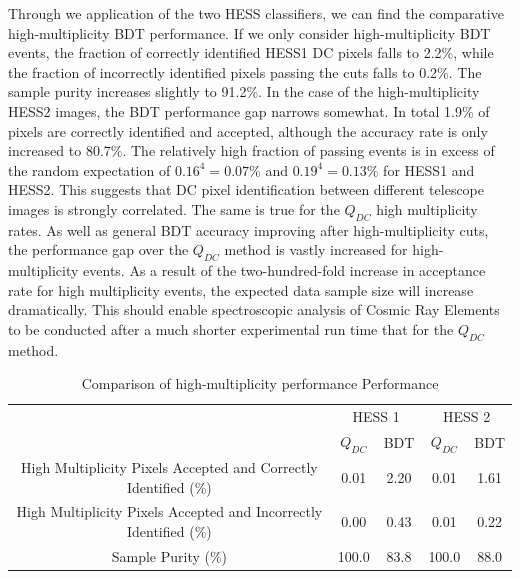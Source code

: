 \documentclass[11pt]{article}
\begin{document}
Through we application of the two HESS classifiers, we can find the comparative high-multiplicity BDT performance. If we only consider high-multiplicity BDT events, the fraction of correctly identified HESS1 DC pixels falls to 2.2\%, while the fraction of incorrectly identified pixels passing the cuts falls to 0.2\%. The sample purity increases slightly to 91.2\%. In the case of the high-multiplicity HESS2 images, the BDT performance gap narrows somewhat. In total 1.9\% of pixels are correctly identified and accepted, although the accuracy rate is only increased to 80.7\%. The relatively high fraction of passing events is in excess of the random expectation of $0.16^{4}=0.07\%$ and $0.19^{4}=0.13\%$ for HESS1 and HESS2. This suggests that DC pixel identification between different telescope images is strongly correlated. The same is true for the $Q_{DC}$ high multiplicity rates. As well as general BDT accuracy improving after high-multiplicity cuts, the performance gap over the $Q_{DC}$ method is vastly increased for high-multiplicity events. As a result of the two-hundred-fold increase in acceptance rate for high multiplicity events, the expected data sample size will increase dramatically. This should enable spectroscopic analysis of Cosmic Ray Elements to be conducted after a much shorter experimental run time that for the $Q_{DC}$ method.

\begin{table}[h!]
  \centering
  \caption{Comparison of high-multiplicity performance Performance}
  \label{tab:highmultiplicitycomparison}
  \begin{tabular}{c|cc|cc}
    \toprule
    & \multicolumn{2}{c|}{HESS 1} & \multicolumn{2}{c}{HESS 2} \\
    & $Q_{DC}$ & BDT & $Q_{DC}$ & BDT\\
    \midrule
    High Multiplicity Pixels Accepted and Correctly Identified (\%)& 0.01 & 2.20 & 0.01 & 1.61\\
    High Multiplicity Pixels Accepted and Incorrectly Identified (\%)  & 0.00 & 0.43 & 0.01 & 0.22\\
    Sample Purity (\%)& 100.0 & 83.8 & 100.0 & 88.0\\
    \bottomrule
  \end{tabular}
\end{table}
\end{document}
